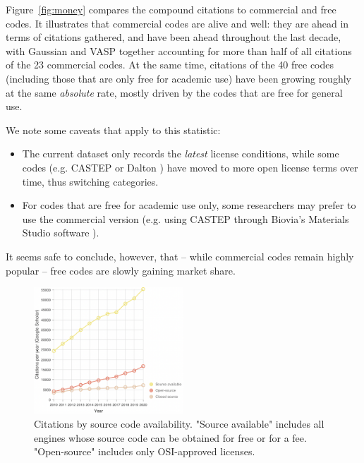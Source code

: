 \documentclass[9pt,review]{livecoms}
\begin{document}
Figure~\ref{fig:money} compares the compound citations to commercial and free codes. 
It illustrates that commercial codes are alive and well:
they are ahead in terms of citations gathered, and have been ahead throughout the last decade, with Gaussian \cite{g16} and VASP \cite{Kresse1996a} together accounting for more than half of all citations of the 23 commercial codes. 
At the same time, citations of the 40 free codes (including those that are only free for academic use) have been growing roughly at the same \emph{absolute} rate, mostly driven by the codes that are free for general use.

We note some caveats that apply to this statistic:
\begin{itemize}
    \item 
        The current dataset only records the \emph{latest} license conditions, while some codes (e.g. CASTEP \cite{Clark2005} or Dalton \cite{Aidas2014}) have moved to more open license terms over time, thus switching categories.
    \item For codes that are free for academic use only, some researchers may prefer to use the commercial version (e.g. using CASTEP through Biovia's Materials Studio software \cite{Meunier2021}).
\end{itemize}
It seems safe to conclude, however, that -- while commercial codes remain highly popular -- free codes are slowly gaining market share.

\begin{figure}
    \includegraphics[width=0.5\textwidth]{figures/code-availability}
    \caption{
        Citations by source code availability.
        "Source available" includes all engines whose source code can be obtained for free or for a fee.
        "Open-source" includes only OSI-approved licenses.
    }
    \label{fig:code-availability}
\end{figure}

\end{document}
